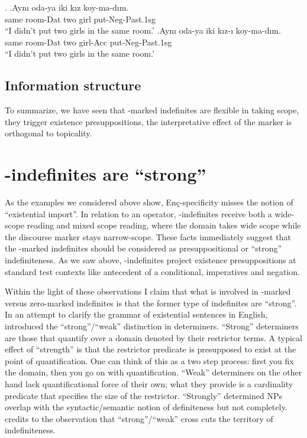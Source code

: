 \documentclass[11pt,a4paper]{article}
\newcommand{\encspec}{Enç-specific}
\begin{document}
\ex.
\ag.\label{odaz}Aynı oda-ya iki kız koy-ma-dım.\\
same room-Dat  two girl put-Neg-Past.1sg\\
``I didn't put two girls in the same room.'
\bg.\label{odaa}Aynı oda-ya iki kız-ı koy-ma-dım.\\
same room-Dat  two girl-Acc put-Neg-Past.1sg\\
``I didn't put two girls in the same room.'


\subsection{Information structure}

To summarize, we have seen that \acc-marked indefinites are flexible in taking scope, they trigger existence presuppositions, the interpretative effect of the marker is orthogonal to topicality.


\section{\acc-indefinites are ``strong''}

As the examples we considered above show, \encspec ity misses the notion of ``existential import''.  In relation to an operator, \acc-indefinites receive both a wide-scope reading and mixed scope reading, where the domain takes wide scope while the discourse marker stays narrow-scope.  These facts immediately suggest that the \acc-marked indefinites should be considered as presuppositional or ``strong'' indefiniteness.  As we saw above, \acc-indefinites project existence presuppositions at standard test contexts like antecedent of a conditional, imperatives and negation. 

Within the light of these observations I claim that what is involved in \acc-marked versus zero-marked indefinites is that the former type of indefinites are ``strong''.  In an attempt to clarify the grammar of existential sentences in English, \cite{milsark77} introduced the ``strong''/``weak'' distinction in determiners. ``Strong'' determiners are those that quantify over a domain denoted by their restrictor terms. A typical effect of ``strength'' is that the restrictor predicate is presupposed to exist at the point of quantification. One can think of this as a two step process: first you fix the domain, then you go on with quantification. ``Weak'' determiners on the other hand lack quantificational force of their own; what they provide is a cardinality predicate that specifies the size of the restrictor. ``Strongly'' determined NPs overlap with the syntactic/semantic notion of definiteness but not completely.  credits to  the observation that ``strong''/``weak'' cross cuts the territory of indefiniteness. 
\end{document}

